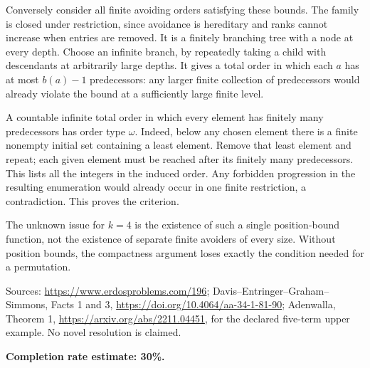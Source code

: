 Conversely consider all finite avoiding orders satisfying these bounds. The family is closed under restriction, since avoidance is hereditary and ranks cannot increase when entries are removed. It is a finitely branching tree with a node at every depth. Choose an infinite branch, by repeatedly taking a child with descendants at arbitrarily large depths. It gives a total order in which each $a$ has at most $b(a)-1$ predecessors: any larger finite collection of predecessors would already violate the bound at a sufficiently large finite level.

A countable infinite total order in which every element has finitely many predecessors has order type $\omega$. Indeed, below any chosen element there is a finite nonempty initial set containing a least element. Remove that least element and repeat; each given element must be reached after its finitely many predecessors. This lists all the integers in the induced order. Any forbidden progression in the resulting enumeration would already occur in one finite restriction, a contradiction. This proves the criterion.

The unknown issue for $k=4$ is the existence of such a single position-bound function, not the existence of separate finite avoiders of every size. Without position bounds, the compactness argument loses exactly the condition needed for a permutation.

Sources: \url{https://www.erdosproblems.com/196}; Davis--Entringer--Graham--Simmons, Facts 1 and 3, \url{https://doi.org/10.4064/aa-34-1-81-90}; Adenwalla, Theorem 1, \url{https://arxiv.org/abs/2211.04451}, for the declared five-term upper example. No novel resolution is claimed.

\textbf{Completion rate estimate: 30\%.}


